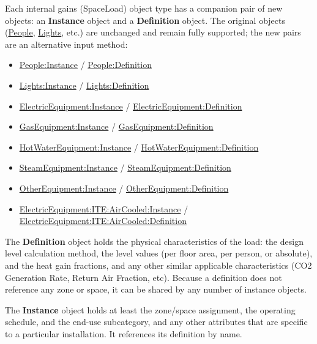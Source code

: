 Each internal gains (SpaceLoad) object type has a companion pair of new objects: an \textbf{Instance} object and a \textbf{Definition} object. The original objects (\hyperref[people]{People}, \hyperref[lights-000]{Lights}, etc.) are unchanged and remain fully supported; the new pairs are an alternative input method:

\begin{itemize}
\tightlist
\item \hyperref[peopleinstance]{People:Instance} / \hyperref[peopledefinition]{People:Definition}
\item \hyperref[lightsinstance]{Lights:Instance} / \hyperref[lightsdefinition]{Lights:Definition}
\item \hyperref[electricequipmentinstance]{ElectricEquipment:Instance} / \hyperref[electricequipmentdefinition]{ElectricEquipment:Definition}
\item \hyperref[gasequipmentinstance]{GasEquipment:Instance} / \hyperref[gasequipmentdefinition]{GasEquipment:Definition}
\item \hyperref[hotwaterequipmentinstance]{HotWaterEquipment:Instance} / \hyperref[hotwaterequipmentdefinition]{HotWaterEquipment:Definition}
\item \hyperref[steamequipmentinstance]{SteamEquipment:Instance} / \hyperref[steamequipmentdefinition]{SteamEquipment:Definition}
\item \hyperref[otherequipmentinstance]{OtherEquipment:Instance} / \hyperref[otherequipmentdefinition]{OtherEquipment:Definition}
\item \hyperref[electricequipmentiteaircooledinstance]{ElectricEquipment:ITE:AirCooled:Instance} / \hyperref[electricequipmentiteaircooleddefinition]{ElectricEquipment:ITE:AirCooled:Definition}
\end{itemize}

The \textbf{Definition} object holds the physical characteristics of the load: the design level calculation method, the level values (per floor area, per person, or absolute), and the heat gain fractions, and any other similar applicable characteristics (CO2 Generation Rate, Return Air Fraction, etc). Because a definition does not reference any zone or space, it can be shared by any number of instance objects.

The \textbf{Instance} object holds at least the zone/space assignment, the operating schedule, and the end-use subcategory, and any other attributes that are specific to a particular installation. It references its definition by name.


